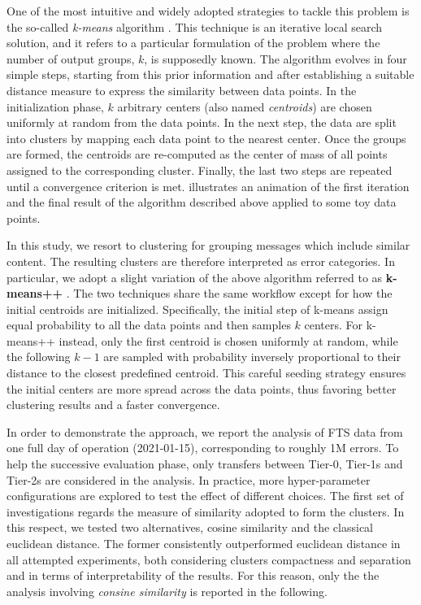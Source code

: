 One of the most intuitive and widely adopted strategies to tackle this problem is the so-called \textit{k-means} algorithm \cite{lloyd1982kmeans}.
This technique is an iterative local search solution, and it refers to a particular formulation of the problem where the number of output groups, $k$, is supposedly known.
The algorithm evolves in four simple steps, starting from this prior information and after establishing a suitable distance measure to express the similarity between data points.
In the initialization phase, $k$ arbitrary centers (also named \textit{centroids}) are chosen uniformly at random from the data points. 
In the next step, the data are split into clusters by mapping each data point to the nearest center. 
Once the groups are formed, the centroids are re-computed as the center of mass of all points assigned to the corresponding cluster.
Finally, the last two steps are repeated until a convergence criterion is met.
 illustrates an animation of the first iteration and the final result of the algorithm described above applied to some toy data points.
 
In this study, we resort to clustering for grouping messages which include similar content.
The resulting clusters are therefore interpreted as error categories.
In particular, we adopt a slight variation of the above algorithm referred to as \textbf{k-means++} \cite{arthur2006kmeans++}.
The two techniques share the same workflow except for how the initial centroids are initialized.  
Specifically, the initial step of k-means assign equal probability to all the data points and then samples $k$ centers.
For k-means++ instead, only the first centroid is chosen uniformly at random, while the following $k-1$ are sampled with probability inversely proportional to their distance to the closest predefined centroid.
This careful seeding strategy ensures the initial centers are more spread across the data points, thus favoring better clustering results and a faster convergence.

In order to demonstrate the approach, we report the analysis of FTS data from one full day of operation (2021-01-15), corresponding to roughly 1M errors.
To help the successive evaluation phase, only transfers between Tier-0, Tier-1s and Tier-2s are considered in the analysis.
In practice, more hyper-parameter configurations are explored to test the effect of different choices.
The first set of investigations regards the measure of similarity adopted to form the clusters. 
In this respect, we tested two alternatives, cosine similarity and the classical euclidean distance.
The former consistently outperformed euclidean distance in all attempted experiments, both considering clusters compactness and separation and in terms of interpretability of the results. For this reason, only the the analysis involving \textit{consine similarity} is reported in the following.


